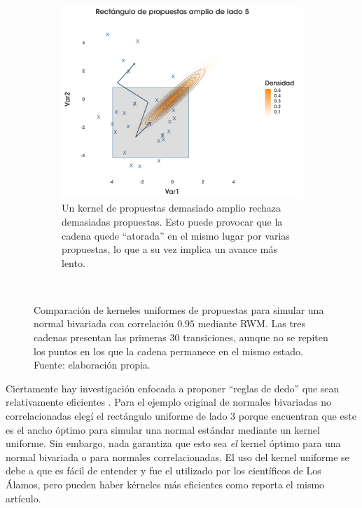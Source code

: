 \begin{figure}[h]
\begin{subfigure}{0.3\textwidth}
    \end{subfigure}
    ~
    \begin{subfigure}{0.3\textwidth}
        \includegraphics[width=\textwidth]{Figs/Bayes/Ejemplo_RWM_Compara3}
        \caption{Un kernel de propuestas demasiado amplio rechaza demasiadas propuestas. Esto puede provocar que la cadena quede ``atorada'' en el mismo lugar por varias propuestas, lo que a su vez implica un avance más lento.}
    \end{subfigure}
    ~
    \caption{Comparación de kerneles uniformes de propuestas para simular una normal bivariada con correlación $0.95$ mediante RWM. Las tres cadenas presentan las primeras $30$ transiciones, aunque no se repiten los puntos en los que la cadena permanece en el mismo estado. Fuente: elaboración propia.}\label{fig:RWM_Corr}
\end{figure}

Ciertamente hay investigación enfocada a proponer ``reglas de dedo'' que sean relativamente eficientes \parencites{GelmanRobertsGilks96,Geyer05,YangRdz13}. Para el ejemplo original de normales bivariadas no correlacionadas elegí el rectángulo uniforme de lado $3$ porque \textcite{YangRdz13} encuentran que este es el ancho óptimo para simular una normal estándar mediante un kernel uniforme. Sin embargo, nada garantiza que esto sea \textit{el} kernel óptimo para una normal bivariada o para normales correlacionadas. El uso del kernel uniforme se debe a que es fácil de entender y fue el utilizado por los científicos de Los Álamos, pero pueden haber kérneles más eficientes como reporta el mismo artículo.\\ 

